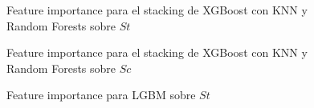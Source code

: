 \documentclass[a4paper, 12pt]{article}
\begin{document}
\begin{figure}[H]
    \centering
    \caption{Feature importance para el stacking de XGBoost con KNN y Random Forests sobre $St$}
\end{figure}

\begin{figure}[H]
    \centering
    \caption{Feature importance para el stacking de XGBoost con KNN y Random Forests sobre $Sc$}
\end{figure}

\begin{figure}[H]
    \centering
    \caption{Feature importance para LGBM sobre $St$}
\end{figure}
\end{document}
